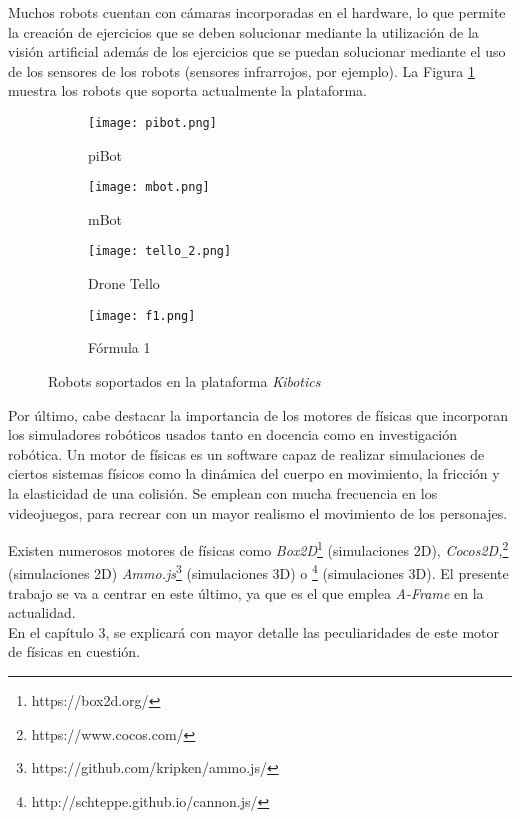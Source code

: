 Muchos robots cuentan con cámaras incorporadas en el hardware, lo que permite la creación de ejercicios que se deben solucionar mediante la utilización de la visión artificial además de los ejercicios que se puedan solucionar mediante el uso de los sensores de los robots (sensores infrarrojos, por ejemplo). La Figura \ref{fig:RobotsKibotics} muestra los robots que soporta actualmente la plataforma.\newline


\begin{figure}[h!]
  \begin{subfigure}[b]{0.2\textwidth}
    \texttt{[image: pibot.png]}
    \caption{piBot}
  \end{subfigure}
  \hfill
  \begin{subfigure}[b]{0.2\textwidth}
    \texttt{[image: mbot.png]}
    \caption{mBot}
  \end{subfigure}
    \hfill
  \begin{subfigure}[b]{0.2\textwidth}
    \texttt{[image: tello\_2.png]}
    \caption{Drone Tello}
  \end{subfigure}
    \hfill
  \begin{subfigure}[b]{0.2\textwidth}
    \texttt{[image: f1.png]}
    \caption{Fórmula 1}
  \end{subfigure}
\caption{Robots soportados en la plataforma \textit{Kibotics}}
\label{fig:RobotsKibotics}
\end{figure}


Por último, cabe destacar la importancia de los motores de físicas que incorporan los simuladores robóticos usados tanto en docencia como en investigación robótica. Un motor de físicas es un software capaz de realizar simulaciones de ciertos sistemas físicos como la dinámica del cuerpo en movimiento, la fricción y la elasticidad de una colisión. Se emplean con mucha frecuencia en los videojuegos, para recrear con un mayor realismo el movimiento de los personajes. \newline

Existen numerosos motores de físicas como \textit{Box2D}\footnote{https://box2d.org/} (simulaciones 2D), \textit{Cocos2D,}\footnote{https://www.cocos.com/} (simulaciones 2D) \textit{Ammo.js}\footnote{https://github.com/kripken/ammo.js/} (simulaciones 3D) o \footnote{http://schteppe.github.io/cannon.js/} (simulaciones 3D). El presente trabajo se va a centrar en este último, ya que es el que emplea \textit{A-Frame} en la actualidad. \\ En el capítulo 3, se explicará con mayor detalle las peculiaridades de este motor de físicas en cuestión. 

